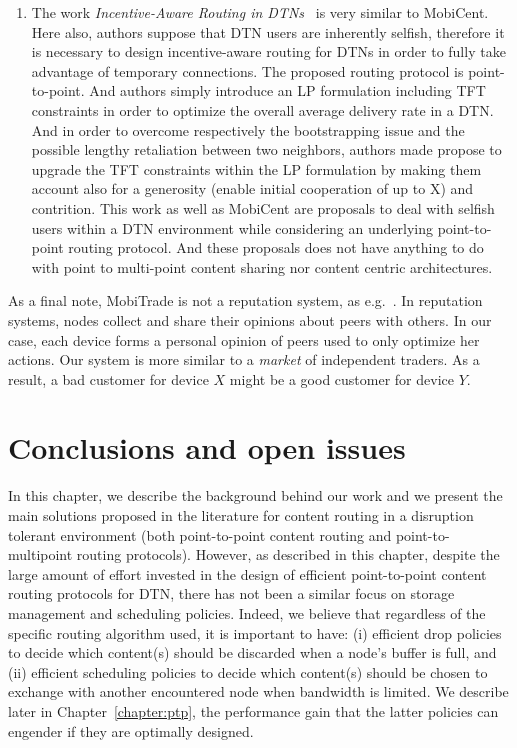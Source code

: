\begin{enumerate}
\item The work \emph{Incentive-Aware Routing in DTNs}~\cite{IADTN} is very similar to MobiCent. Here also, authors suppose that DTN users are inherently selfish, therefore it is necessary to design incentive-aware routing for DTNs in order to fully take advantage of temporary connections. The proposed routing protocol is point-to-point. And authors simply introduce an LP formulation including TFT constraints in order to optimize the overall average delivery rate in a DTN. And in order to overcome respectively the bootstrapping issue and the possible lengthy retaliation between two neighbors, authors made propose to upgrade the TFT constraints within the LP formulation by making them account also for a generosity (enable initial cooperation of up to X) and contrition. This work as well as MobiCent are proposals to deal with selfish users within a DTN environment while considering an underlying point-to-point routing protocol. And these proposals does not have anything to do with point to multi-point content sharing nor content centric architectures.

\end{enumerate}

As a final note, MobiTrade is not a reputation system, as e.g.~\cite{Reputation}. In reputation systems, nodes collect and share their opinions about peers with others. In our case, each device forms a personal opinion of peers used to only optimize her actions. Our system is more similar to a \emph{market} of independent traders. As a result, a bad customer for device $X$ might be a good customer for device $Y$.

\section{Conclusions and open issues}

In this chapter, we describe the background behind our work and we present the main solutions proposed in the literature for content routing in a disruption tolerant environment (both point-to-point content routing and point-to-multipoint routing protocols). However, as described in this chapter, despite the large amount of effort invested in the design of efficient point-to-point content routing protocols for DTN, there has not been a similar focus on storage management and scheduling policies. Indeed, we believe that regardless of the specific routing algorithm used, it is important to have: (i) efficient drop policies to decide which content(s) should be discarded when a node's buffer is full, and (ii) efficient scheduling policies to decide which content(s) should be chosen to exchange with another encountered node when bandwidth is limited. We describe later in Chapter~\ref{chapter:ptp}, the performance gain that the latter policies can engender if they are optimally designed. 

